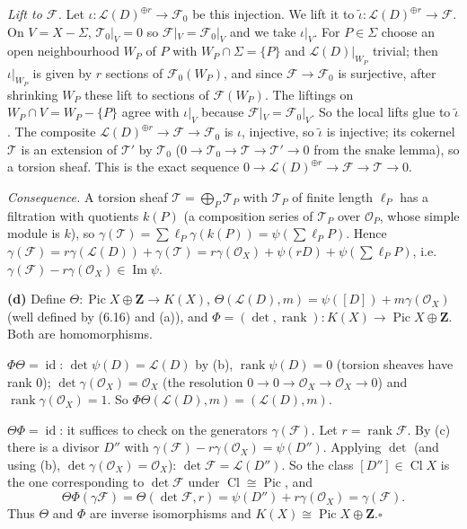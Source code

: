 \documentclass[11pt]{article}
\begin{document}
\emph{Lift to $\mathcal F$.} Let $\iota:\mathcal L(D)^{\oplus r}\to\mathcal F_0$ be this injection. We lift it to $\tilde\iota:\mathcal L(D)^{\oplus r}\to\mathcal F$. On $V=X-\Sigma$, $\mathcal T_0|_V=0$ so $\mathcal F|_V=\mathcal F_0|_V$ and we take $\iota|_V$. For $P\in\Sigma$ choose an open neighbourhood $W_P$ of $P$ with $W_P\cap\Sigma=\{P\}$ and $\mathcal L(D)|_{W_P}$ trivial; then $\iota|_{W_P}$ is given by $r$ sections of $\mathcal F_0(W_P)$, and since $\mathcal F\to\mathcal F_0$ is surjective, after shrinking $W_P$ these lift to sections of $\mathcal F(W_P)$. The liftings on $W_P\cap V=W_P-\{P\}$ agree with $\iota|_V$ because $\mathcal F|_V=\mathcal F_0|_V$. So the local lifts glue to $\tilde\iota$. The composite $\mathcal L(D)^{\oplus r}\to\mathcal F\to\mathcal F_0$ is $\iota$, injective, so $\tilde\iota$ is injective; its cokernel $\mathcal T$ is an extension of $\mathcal T'$ by $\mathcal T_0$ ($0\to\mathcal T_0\to\mathcal T\to\mathcal T'\to0$ from the snake lemma), so a torsion sheaf. This is the exact sequence $0\to\mathcal L(D)^{\oplus r}\to\mathcal F\to\mathcal T\to0$.

\emph{Consequence.} A torsion sheaf $\mathcal T=\bigoplus_P\mathcal T_P$ with $\mathcal T_P$ of finite length $\ell_P$ has a filtration with quotients $k(P)$ (a composition series of $\mathcal T_P$ over $\mathcal O_P$, whose simple module is $k$), so $\gamma(\mathcal T)=\sum\ell_P\gamma(k(P))=\psi(\sum\ell_PP)$. Hence $\gamma(\mathcal F)=r\gamma(\mathcal L(D))+\gamma(\mathcal T)=r\gamma(\mathcal O_X)+\psi(rD)+\psi(\sum\ell_PP)$, i.e.\ $\gamma(\mathcal F)-r\gamma(\mathcal O_X)\in\operatorname{Im}\psi$.

\textbf{(d)} Define $\Theta:\operatorname{Pic}X\oplus\mathbf Z\to K(X)$, $\Theta(\mathcal L(D),m)=\psi([D])+m\gamma(\mathcal O_X)$ (well defined by (6.16) and (a)), and $\Phi=(\det,\operatorname{rank}):K(X)\to\operatorname{Pic}X\oplus\mathbf Z$. Both are homomorphisms. 

$\Phi\Theta=\operatorname{id}$: $\det\psi(D)=\mathcal L(D)$ by (b), $\operatorname{rank}\psi(D)=0$ (torsion sheaves have rank $0$); $\det\gamma(\mathcal O_X)=\mathcal O_X$ (the resolution $0\to0\to\mathcal O_X\to\mathcal O_X\to0$) and $\operatorname{rank}\gamma(\mathcal O_X)=1$. So $\Phi\Theta(\mathcal L(D),m)=(\mathcal L(D),m)$.

$\Theta\Phi=\operatorname{id}$: it suffices to check on the generators $\gamma(\mathcal F)$. Let $r=\operatorname{rank}\mathcal F$. By (c) there is a divisor $D''$ with $\gamma(\mathcal F)-r\gamma(\mathcal O_X)=\psi(D'')$. Applying $\det$ (and using (b), $\det\gamma(\mathcal O_X)=\mathcal O_X$): $\det\mathcal F=\mathcal L(D'')$. So the class $[D'']\in\operatorname{Cl}X$ is the one corresponding to $\det\mathcal F$ under $\operatorname{Cl}\cong\operatorname{Pic}$, and
\[\Theta\Phi(\gamma\mathcal F)=\Theta(\det\mathcal F,r)=\psi(D'')+r\gamma(\mathcal O_X)=\gamma(\mathcal F).\]
Thus $\Theta$ and $\Phi$ are inverse isomorphisms and $K(X)\cong\operatorname{Pic}X\oplus\mathbf Z$.\hfill$\square$
\end{document}
